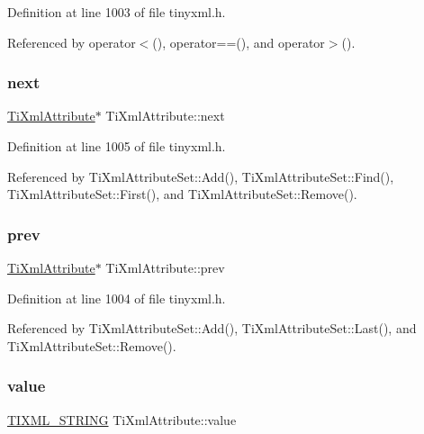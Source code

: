 Definition at line 1003 of file tinyxml.\+h.



Referenced by operator$<$(), operator==(), and operator$>$().

\hypertarget{class_ti_xml_attribute_ae851adf61b80cf45b797fee77dea135f}{}\label{class_ti_xml_attribute_ae851adf61b80cf45b797fee77dea135f} 
\subsubsection{\texorpdfstring{next}{next}}
{\footnotesize\ttfamily \hyperlink{class_ti_xml_attribute}{Ti\+Xml\+Attribute}$\ast$ Ti\+Xml\+Attribute\+::next\hspace{0.3cm}{\ttfamily [private]}}



Definition at line 1005 of file tinyxml.\+h.



Referenced by Ti\+Xml\+Attribute\+Set\+::\+Add(), Ti\+Xml\+Attribute\+Set\+::\+Find(), Ti\+Xml\+Attribute\+Set\+::\+First(), and Ti\+Xml\+Attribute\+Set\+::\+Remove().

\hypertarget{class_ti_xml_attribute_aaf6c6272c625fbf38e571cbf570ea94a}{}\label{class_ti_xml_attribute_aaf6c6272c625fbf38e571cbf570ea94a} 
\subsubsection{\texorpdfstring{prev}{prev}}
{\footnotesize\ttfamily \hyperlink{class_ti_xml_attribute}{Ti\+Xml\+Attribute}$\ast$ Ti\+Xml\+Attribute\+::prev\hspace{0.3cm}{\ttfamily [private]}}



Definition at line 1004 of file tinyxml.\+h.



Referenced by Ti\+Xml\+Attribute\+Set\+::\+Add(), Ti\+Xml\+Attribute\+Set\+::\+Last(), and Ti\+Xml\+Attribute\+Set\+::\+Remove().

\hypertarget{class_ti_xml_attribute_ae9e4e5f442347434b1da43954cc1b411}{}\label{class_ti_xml_attribute_ae9e4e5f442347434b1da43954cc1b411} 
\subsubsection{\texorpdfstring{value}{value}}
{\footnotesize\ttfamily \hyperlink{tinyxml_8h_a92bada05fd84d9a0c9a5bbe53de26887}{T\+I\+X\+M\+L\+\_\+\+S\+T\+R\+I\+NG} Ti\+Xml\+Attribute\+::value\hspace{0.3cm}{\ttfamily [private]}}



